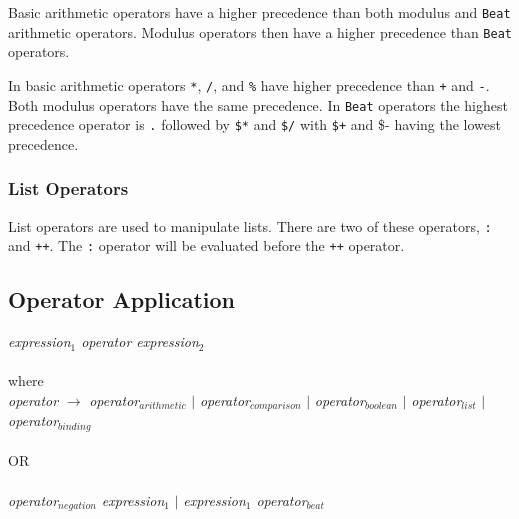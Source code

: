 Basic arithmetic operators have a higher precedence than both
modulus and \texttt{Beat} arithmetic operators. Modulus operators 
then have a higher precedence than \texttt{Beat} operators. 

In basic arithmetic operators \texttt{*}, \texttt{/}, and \texttt{\%} 
have higher precedence than \texttt{+} and \texttt{-}. 
Both modulus operators have the same precedence. In \texttt{Beat} 
operators the highest precedence operator is \texttt{.} followed 
by \texttt{\$*} and \texttt{\$/} with \texttt{\$+} and {\$-} having 
the lowest precedence. 
\subsubsection{List Operators}
List operators are used to manipulate lists. 
There are two of these operators,
\texttt{:} and \texttt{++}. The \texttt{:} operator will be evaluated before the \texttt{++} operator. 

\subsection{Operator Application}
\label{sec:operator application}
    \emph{expression$_{1}$  operator  expression$_{2}$}\\ \\
    where\\
    
    \emph{operator} $\rightarrow$ 
        \emph{operator$_{arithmetic}$} $|$
        \emph{operator$_{comparison}$}  $|$ 
        \emph{operator$_{boolean}$}  $|$
        \emph{operator$_{list}$}  $|$
        \emph{operator$_{binding}$} \\ \\
OR\\ \\
          \emph{operator$_{negation}$  expression$_{1}$} $|$
					\emph{expression$_{1}$ operator$_{beat}$}\\ \\
    
